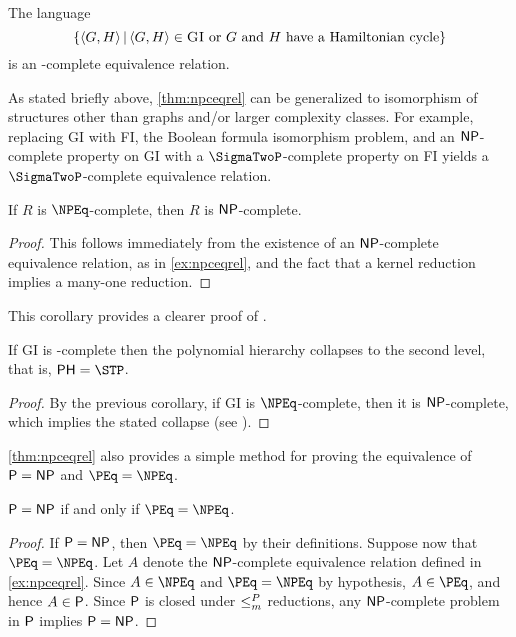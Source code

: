 \begin{example}\label{ex:npceqrel}
  The language
  \begin{equation*}
    \left\{ \pair{G}{H} \, \middle| \, \pair{G}{H} \in \textsc{GI} \text{ or } G \text{ and } H \text{ have a Hamiltonian cycle}  \right\}
  \end{equation*}
  is an \NP-complete equivalence relation.
\end{example}

\begin{example}
  As stated briefly above, \autoref{thm:npceqrel} can be generalized to isomorphism of structures other than graphs and/or larger complexity classes.
  For example, replacing \textsc{GI} with \textsc{FI}, the Boolean formula isomorphism problem, and an $\NP$-complete property on \textsc{GI} with a $\SigmaTwoP$-complete property on \textsc{FI} yields a $\SigmaTwoP$-complete equivalence relation.
\end{example}

\begin{corollary}
  If $R$ is $\NPEq$-complete, then $R$ is $\NP$-complete.
\end{corollary}
\begin{proof}
  This follows immediately from the existence of an $\NP$-complete equivalence relation, as in \autoref{ex:npceqrel}, and the fact that a kernel reduction implies a many-one reduction.
\end{proof}

This corollary provides a clearer proof of \autocite[Proposition~8.1]{bcffm}.

\begin{corollary}
  If \textsc{GI} is \NPEq-complete then the polynomial hierarchy collapses to the second level, that is, $\PH = \STP$.
\end{corollary}
\begin{proof}
  By the previous corollary, if \textsc{GI} is $\NPEq$-complete, then it is $\NP$-complete, which implies the stated collapse (see \autocite{schoning87}).
\end{proof}

\autoref{thm:npceqrel} also provides a simple method for proving the equivalence of $\P = \NP$ and $\PEq = \NPEq$.

\begin{theorem}\label{thm:pnppeqnpeq}
  $\P = \NP$ if and only if $\PEq = \NPEq$.
\end{theorem}
\begin{proof}
  If $\P = \NP$, then $\PEq = \NPEq$ by their definitions.
  Suppose now that $\PEq = \NPEq$.
  Let $A$ denote the $\NP$-complete equivalence relation defined in \autoref{ex:npceqrel}.
  Since $A \in \NPEq$ and $\PEq = \NPEq$ by hypothesis, $A \in \PEq$, and hence $A \in \P$.
  Since $\P$ is closed under $\mor$ reductions, any $\NP$-complete problem in $\P$ implies $\P = \NP$.
\end{proof}

